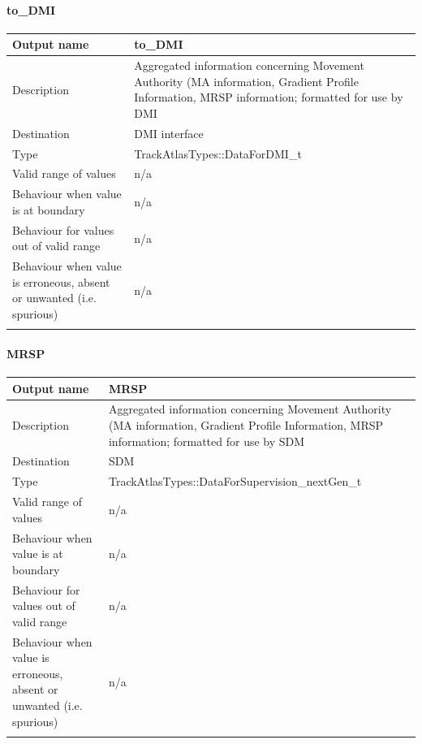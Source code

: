 \paragraph{to\_DMI}

\begin{longtable}{p{}p{}}
\toprule
Output name				& to\_DMI \\
\midrule
Description				& Aggregated information concerning Movement Authority (MA information, Gradient Profile Information, MRSP information; formatted for use by DMI \\
\midrule
Destination				& DMI interface  \\ 
\midrule
Type					& TrackAtlasTypes::DataForDMI\_t\\
\midrule
Valid range of values	& n/a \\
\midrule
Behaviour when value is at boundary	& n/a  \\
\midrule
Behaviour for values out of valid range	& n/a  \\
\midrule
Behaviour when value is erroneous, absent or unwanted (i.e. spurious) & n/a  \\
\\
\bottomrule
\end{longtable}

\paragraph{MRSP}

\begin{longtable}{p{}p{}}
\toprule
Output name				& MRSP \\
\midrule
Description				& Aggregated information concerning Movement Authority (MA information, Gradient Profile Information, MRSP information; formatted for use by SDM \\
\midrule
Destination				& SDM  \\ 
\midrule
Type					& TrackAtlasTypes::DataForSupervision\_nextGen\_t\\
\midrule
Valid range of values	& n/a \\
\midrule
Behaviour when value is at boundary	& n/a  \\
\midrule
Behaviour for values out of valid range	& n/a  \\
\midrule
Behaviour when value is erroneous, absent or unwanted (i.e. spurious) & n/a  \\
\\
\bottomrule
\end{longtable}

